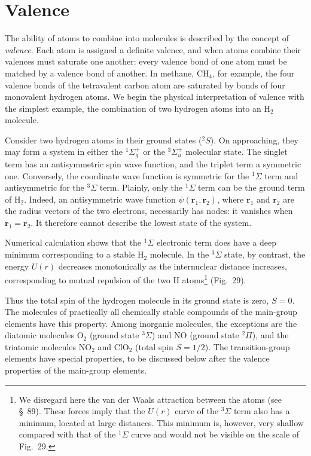 \section{Valence}

The ability of atoms to combine into molecules is described by the concept of \emph{valence}. Each atom is assigned a definite valence, and when atoms combine their valences must saturate one another: every valence bond of one atom must be matched by a valence bond of another. In methane, $\mathrm{CH}_4$, for example, the four valence bonds of the tetravalent carbon atom are saturated by bonds of four monovalent hydrogen atoms. We begin the physical interpretation of valence with the simplest example, the combination of two hydrogen atoms into an $\mathrm H_2$ molecule.

Consider two hydrogen atoms in their ground states (${}^2S$). On approaching, they may form a system in either the ${}^1\Sigma_g^+$ or the ${}^3\Sigma_u^+$ molecular state. The singlet term has an antisymmetric spin wave function, and the triplet term a symmetric one. Conversely, the coordinate wave function is symmetric for the ${}^1\Sigma$ term and antisymmetric for the ${}^3\Sigma$ term. Plainly, only the ${}^1\Sigma$ term can be the ground term of $\mathrm H_2$. Indeed, an antisymmetric wave function $\psi(\mathbf r_1,\mathbf r_2)$, where $\mathbf r_1$ and $\mathbf r_2$ are the radius vectors of the two electrons, necessarily has nodes: it vanishes when $\mathbf r_1=\mathbf r_2$. It therefore cannot describe the lowest state of the system.

Numerical calculation shows that the ${}^1\Sigma$ electronic term does have a deep minimum corresponding to a stable $\mathrm H_2$ molecule. In the ${}^3\Sigma$ state, by contrast, the energy $U(r)$ decreases monotonically as the internuclear distance increases, corresponding to mutual repulsion of the two H atoms\footnote{We disregard here the van der Waals attraction between the atoms (see \S~89). These forces imply that the $U(r)$ curve of the ${}^3\Sigma$ term also has a minimum, located at large distances. This minimum is, however, very shallow compared with that of the ${}^1\Sigma$ curve and would not be visible on the scale of Fig.~29.} (Fig.~29).

Thus the total spin of the hydrogen molecule in its ground state is zero, $S=0$. The molecules of practically all chemically stable compounds of the main-group elements have this property. Among inorganic molecules, the exceptions are the diatomic molecules $\mathrm O_2$ (ground state ${}^3\Sigma$) and NO (ground state ${}^2\Pi$), and the triatomic molecules $\mathrm{NO}_2$ and $\mathrm{ClO}_2$ (total spin $S=1/2$). The transition-group elements have special properties, to be discussed below after the valence properties of the main-group elements.

